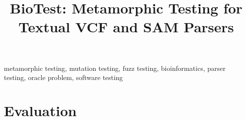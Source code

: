 \documentclass[conference]{IEEEtran}
\begin{document}
\title{BioTest: Metamorphic Testing for Textual VCF and SAM Parsers}

\author{
}

\maketitle

\begin{abstract}

\end{abstract}

\begin{IEEEkeywords}
metamorphic testing, mutation testing, fuzz testing,
bioinformatics, parser testing, oracle problem, software
testing
\end{IEEEkeywords}





\FloatBarrier
\section{Evaluation}
\label{sec:evaluation}










\FloatBarrier


\end{document}
